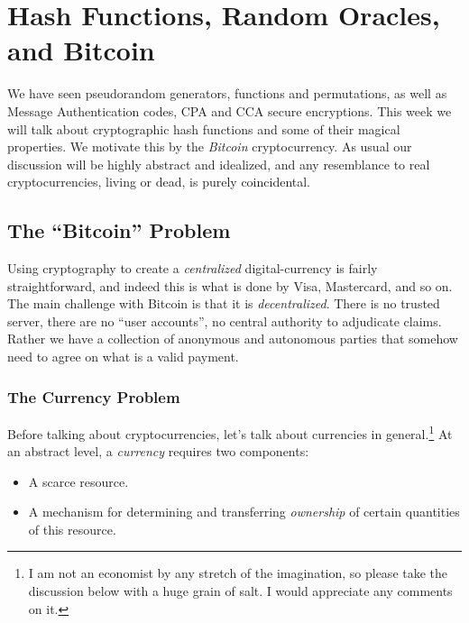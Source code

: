 \chapter{Hash Functions, Random Oracles, and
Bitcoin}\label{7-Hash-Functions-Random-}

We have seen pseudorandom generators, functions and permutations, as
well as Message Authentication codes, CPA and CCA secure encryptions.
This week we will talk about cryptographic hash functions and some of
their magical properties. We motivate this by the \emph{Bitcoin}
cryptocurrency. As usual our discussion will be highly abstract and
idealized, and any resemblance to real cryptocurrencies, living or dead,
is purely coincidental.

\section{The ``Bitcoin'' Problem}\label{7-The-Bitcoin-Problem}

Using cryptography to create a \emph{centralized} digital-currency is
fairly straightforward, and indeed this is what is done by Visa,
Mastercard, and so on. The main challenge with Bitcoin is that it is
\emph{decentralized}. There is no trusted server, there are no ``user
accounts'', no central authority to adjudicate claims. Rather we have a
collection of anonymous and autonomous parties that somehow need to
agree on what is a valid payment.

\subsection{The Currency Problem}\label{7-The-Currency-Problem}

Before talking about cryptocurrencies, let's talk about currencies in
general.\footnote{I am not an economist by any stretch of the
  imagination, so please take the discussion below with a huge grain of
  salt. I would appreciate any comments on it.} At an abstract level, a
\emph{currency} requires two components:

\begin{itemize}
\item
  A scarce resource.
\item
  A mechanism for determining and transferring \emph{ownership} of
  certain quantities of this resource.
\end{itemize}

